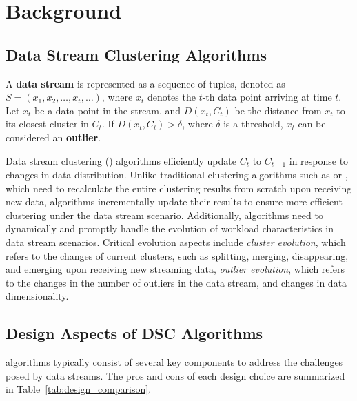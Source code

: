 \section{Background}
\label{sec:background}

\subsection{Data Stream Clustering Algorithms}
\label{sec:foundational_concepts}
\begin{definition}
A \textbf{data stream} is represented as a sequence of tuples, denoted as \( S = (x_1, x_2, \ldots, x_t, \ldots) \), where \( x_t \) denotes the \( t \)-th data point arriving at time \( t \). Let \( x_t \) be a data point in the stream, and \( D(x_t, C_t) \) be the distance from \( x_t \) to its closest cluster in \( C_t \). If \( D(x_t, C_t) > \delta \), where \( \delta \) is a threshold, \( x_t \) can be considered an \textbf{outlier}. 
\end{definition}

Data stream clustering (\dsc) algorithms efficiently update \( C_t \) to \( C_{t+1} \) in response to changes in data distribution. Unlike traditional clustering algorithms such as \kmeans or \dbscan, which need to recalculate the entire clustering results from scratch upon receiving new data, \dsc algorithms incrementally update their results to ensure more efficient clustering under the data stream scenario. Additionally, \dsc algorithms need to dynamically and promptly handle the evolution of workload characteristics in data stream scenarios. Critical evolution aspects include \emph{cluster evolution}, which refers to the changes of current clusters, such as splitting, merging, disappearing, and emerging upon receiving new streaming data, \emph{outlier evolution}, which refers to the changes in the number of outliers in the data stream, and changes in data dimensionality.

\subsection{Design Aspects of DSC Algorithms}
\dsc algorithms typically consist of several key components to address the challenges posed by data streams. The pros and cons of each design choice are summarized in Table~\ref{tab:design_comparison}. 


